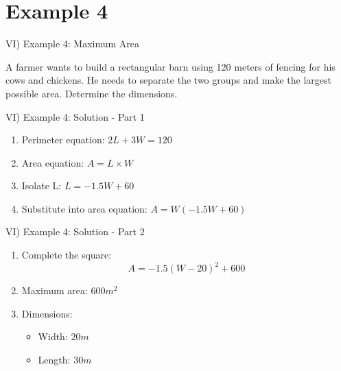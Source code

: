 \documentclass[aspectratio=169]{beamer}
\begin{document}
\section{Example 4}

\begin{frame}{VI) Example 4: Maximum Area}
    \begin{tcolorbox}[colback=lightgray,colframe=primary,title=Problem]
        \footnotesize
        A farmer wants to build a rectangular barn using 120 meters of fencing for his cows and chickens. He needs to separate the two groups and make the largest possible area. Determine the dimensions.
    \end{tcolorbox}
\end{frame}

\begin{frame}{VI) Example 4: Solution - Part 1}
    \begin{tcolorbox}[colback=lightgray,colframe=accent,title=Solution - Part 1]
        \footnotesize
        \begin{enumerate}
            \item Perimeter equation: $2L + 3W = 120$
            \item Area equation: $A = L \times W$
            \item Isolate L: $L = -1.5W + 60$
            \item Substitute into area equation: $A = W(-1.5W + 60)$
        \end{enumerate}
    \end{tcolorbox}
\end{frame}

\begin{frame}{VI) Example 4: Solution - Part 2}
    \begin{tcolorbox}[colback=lightgray,colframe=accent,title=Solution - Part 2]
        \footnotesize
        \begin{enumerate}
            \item Complete the square:
            \[A = -1.5(W - 20)^2 + 600\]
            \item Maximum area: $600 m^2$
            \item Dimensions:
            \begin{itemize}
                \item Width: $20m$
                \item Length: $30m$
            \end{itemize}
        \end{enumerate}
    \end{tcolorbox}
\end{frame}
\end{document}
